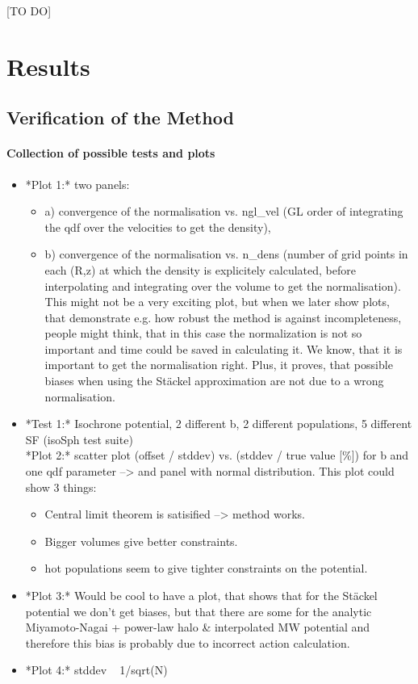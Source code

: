 \documentclass[12pt,preprint]{aastex}
\begin{document}
[TO DO]

\section{Results}

\subsection{Verification of the Method}

\paragraph{Collection of possible tests and plots}

\begin{itemize}
\item *Plot 1:* two panels: 
\begin{itemize}
\item a) convergence of the normalisation vs. ngl\_vel (GL order of integrating the qdf over the velocities to get the density), 
\item b) convergence of the normalisation vs. n\_dens (number of grid points in each (R,z) at which the density is explicitely calculated, before interpolating and integrating over the volume to get the normalisation). \\ 
 This might not be a very exciting plot, but when we later show plots, that demonstrate e.g. how robust the method is against incompleteness, people might think, that in this case the normalization is not so important and time could be saved in calculating it. We know, that it is important to get the normalisation right. Plus, it proves, that possible biases when using the St\"ackel approximation are not due to a wrong normalisation.
 \end{itemize}
\item *Test 1:* Isochrone potential, 2 different b, 2 different populations, 5 different SF (isoSph test suite) \\
*Plot 2:* scatter plot (offset / stddev) vs. (stddev / true value [\%]) for b and one qdf parameter --> and panel with normal distribution. This plot could show 3 things:
\begin{itemize}
\item Central limit theorem is satisified --> method works.
\item Bigger volumes give better constraints.
\item hot populations seem to give tighter constraints on the potential.
\end{itemize}
\item *Plot 3:* Would be cool to have a plot, that shows that for the St\"ackel potential we don't get biases, but that there are some for the analytic Miyamoto-Nagai + power-law halo \& interpolated MW potential and therefore this bias is probably due to incorrect action calculation.
\item *Plot 4:* stddev ~ 1/sqrt(N)
\end{itemize}
\end{document}
